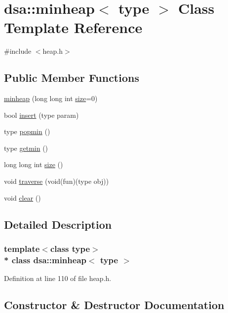 \hypertarget{classdsa_1_1minheap}{}\section{dsa\+:\+:minheap$<$ type $>$ Class Template Reference}
\label{classdsa_1_1minheap}


{\ttfamily \#include $<$heap.\+h$>$}

\subsection*{Public Member Functions}
\begin{DoxyCompactItemize}
\item 
\hyperlink{classdsa_1_1minheap_abb5f8dd0ece93a4760331b7ea6b3fa79}{minheap} (long long int \hyperlink{classdsa_1_1minheap_ad6a11d886323ea1de257f9f037cf9a8e}{size}=0)
\item 
bool \hyperlink{classdsa_1_1minheap_a16d0dbf5e5555284ee99848439e49d5f}{insert} (type param)
\item 
type \hyperlink{classdsa_1_1minheap_a6ae31969f60b33c53579043e28a7b924}{popmin} ()
\item 
type \hyperlink{classdsa_1_1minheap_ac3497246b8cccd470f3a4bd8d5b3fe32}{getmin} ()
\item 
long long int \hyperlink{classdsa_1_1minheap_ad6a11d886323ea1de257f9f037cf9a8e}{size} ()
\item 
void \hyperlink{classdsa_1_1minheap_a55dae20f1b6927c078bf1f67d331dce1}{traverse} (void(fun)(type obj))
\item 
void \hyperlink{classdsa_1_1minheap_ae0f06ffe2733aa138b84be5a205e5e16}{clear} ()
\end{DoxyCompactItemize}


\subsection{Detailed Description}
\subsubsection*{template$<$class type$>$\\*
class dsa\+::minheap$<$ type $>$}



Definition at line 110 of file heap.\+h.



\subsection{Constructor \& Destructor Documentation}
